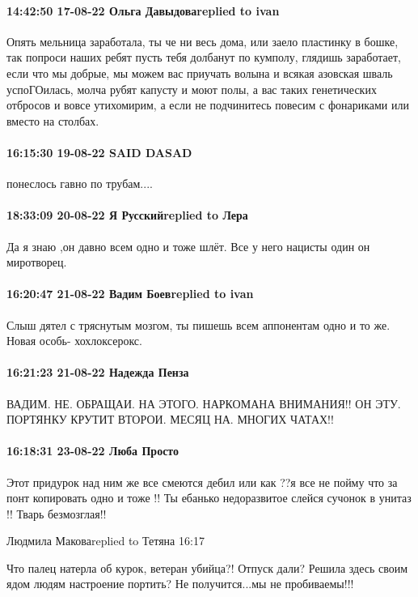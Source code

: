  
 
 
 
 

\paragraph{14:42:50 17-08-22 Ольга Давыдоваreplied to ivan}

Опять мельница заработала, ты че ни весь дома, или заело пластинку в бошке, так
попроси наших ребят пусть тебя долбанут по кумполу, глядишь заработает, если
что мы добрые, мы можем вас приучать волына и всякая азовская шваль
успоГОилась, молча рубят капусту и моют полы, а вас таких генетических отбросов
и вовсе утихомирим, а если не подчинитесь повесим с фонариками или вместо на
столбах.

\paragraph{16:15:30 19-08-22 SAID DASAD}

понеслось гавно по трубам....

\paragraph{18:33:09 20-08-22 Я Русскийreplied to Лера}

Да я знаю ,он давно всем одно и тоже шлёт. Все у него нацисты один он
миротворец.

\paragraph{16:20:47 21-08-22 Вадим Боевreplied to ivan}

Слыш дятел с тряснутым мозгом, ты пишешь всем аппонентам одно и то же. Новая
особь- хохлоксерокс.

\paragraph{16:21:23 21-08-22 Надежда Пенза}

ВАДИМ. НЕ. ОБРАЩАИ. НА ЭТОГО. НАРКОМАНА ВНИМАНИЯ!! ОН ЭТУ. ПОРТЯНКУ КРУТИТ
ВТОРОИ. МЕСЯЦ НА. МНОГИХ ЧАТАХ!!

\paragraph{16:18:31 23-08-22 Люба Просто}

Этот придурок над ним же все смеются дебил или как ??я все не пойму что за понт
копировать одно и тоже !! Ты ебанько недоразвитое слейся сучонок в унитаз !!
Тварь безмозглая!!

Людмила Маковаreplied to Тетяна
16:17

Что палец натерла об курок, ветеран убийца?! Отпуск дали? Решила здесь своим
ядом людям настроение портить?  Не получится...мы не пробиваемы!!!
